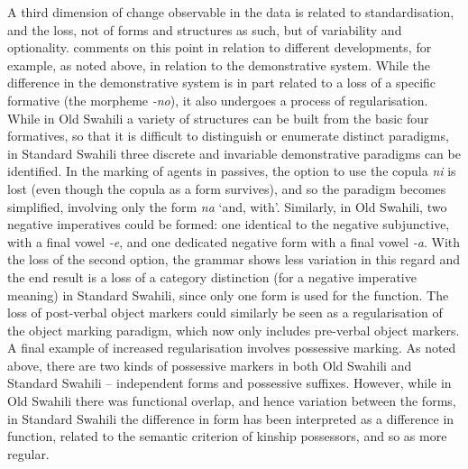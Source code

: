 \documentclass[output=paper]{langscibook}
\begin{document}
  A third dimension of change observable in the data is related to standardisation, and the loss, not of forms and structures as such, but of variability and optionality. \citet{Miehe1979} comments on this point in relation to different developments, for example, as noted above, in relation to the demonstrative system. While the difference in the demonstrative system is in part related to a loss of a specific formative (the morpheme \textit{{}-no}), it also undergoes a process of regularisation. While in Old Swahili a variety of structures can be built from the basic four formatives, so that it is difficult to distinguish or enumerate distinct paradigms, in Standard Swahili three discrete and invariable demonstrative paradigms can be identified. In the marking of agents in passives, the option to use the copula \textit{ni} is lost (even though the copula as a form survives), and so the paradigm becomes simplified, involving only the form \textit{na} ‘and, with’. Similarly, in Old Swahili, two negative imperatives could be formed: one identical to the negative subjunctive, with a final vowel \textit{{}-e}, and one dedicated negative form with a final vowel \textit{{}-a}. With the loss of the second option, the grammar shows less variation in this regard and the end result is a loss of a category distinction (for a negative imperative meaning) in Standard Swahili, since only one form is used for the function. The loss of post-verbal object markers could similarly be seen as a regularisation of the object marking paradigm, which now only includes pre-verbal object markers. A final example of increased regularisation involves possessive marking. As noted above, there are two kinds of possessive markers in both Old Swahili and Standard Swahili -- independent forms and possessive suffixes. However, while in Old Swahili there was functional overlap, and hence variation between the forms, in Standard Swahili the difference in form has been interpreted as a difference in function, related to the semantic criterion of kinship possessors, and so as more regular. 
\end{document}
